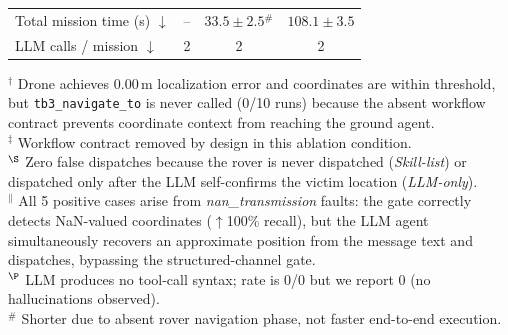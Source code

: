 \begin{table}[t]
\begin{tabular}{@{}lccc@{}}
\quad Total mission time (s) $\downarrow$        & --              & $33.5{\pm}2.5$$^\#$ & $108.1{\pm}3.5$ \\
\quad LLM calls / mission $\downarrow$           & 2               & 2               & 2                 \\
\bottomrule
\end{tabular}
\vspace{2pt}
{\scriptsize
$^\dagger$ Drone achieves 0.00\,m localization error and coordinates are within threshold,
  but \texttt{tb3\_navigate\_to} is never called (0/10 runs) because the absent workflow
  contract prevents coordinate context from reaching the ground agent.\\
$^\ddagger$ Workflow contract removed by design in this ablation condition.\\
$^\S$ Zero false dispatches because the rover is never dispatched (\textit{Skill-list})
  or dispatched only after the LLM self-confirms the victim location (\textit{LLM-only}).\\
$^\|$ All 5 positive cases arise from \textit{nan\_transmission} faults: the gate correctly
  detects NaN-valued coordinates (${\uparrow}$100\% recall), but the LLM agent
  simultaneously recovers an approximate position from the message text and dispatches,
  bypassing the structured-channel gate.\\
$^\P$ LLM produces no tool-call syntax; rate is 0/0 but we report 0 (no hallucinations observed).\\
$^\#$ Shorter due to absent rover navigation phase, not faster end-to-end execution.
}
\end{table}
